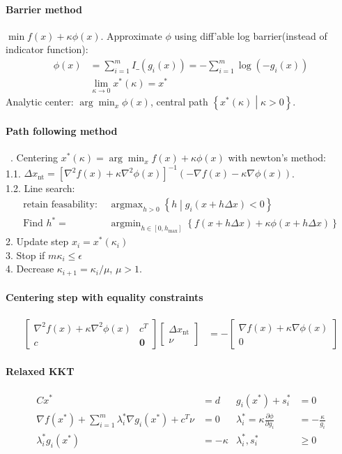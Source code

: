 \documentclass[landscape,a4paper,8pt]{scrartcl}
\newcommand{\Me}[1]{\begin{bmatrix}#1\end{bmatrix}} %
\DeclareMathOperator\argmin{argmin}
\DeclareMathOperator\argmax{argmax}
\begin{document}
\begin{multicols*}{3}
\paragraph{Barrier method}
$\min f(x) + \kappa \phi(x)$.
Approximate $\phi$ using diff'able log barrier(instead of indicator function):
\begin{align*}
\phi(x) &= \sum_{i=1}^{m} I\_(g_i(x)) = -\sum_{i=1}^{m} \log(-g_i(x)) \\
        & \lim_{\kappa \rightarrow 0} x^*(\kappa) = x^*
\end{align*}
Analytic center: $\arg\min_x \phi(x)$, central path $\left\{x^*(\kappa) \middle| \kappa > 0 \right\}$.

\paragraph{Path following method} \ . Centering 
$x^*(\kappa) = \arg\min_x f(x) + \kappa\phi(x)$ with newton's method: \\
1.1. $\Delta x_\text{nt} = \left[\nabla^2 f(x) + \kappa \nabla^2\phi(x)\right]^{-1}(-\nabla f(x) - \kappa \nabla \phi(x))$. \\
1.2. Line search:
\begin{align*}
\text{retain feasability: } & \argmax_{h > 0} \left\{ h \middle| g_i(x+h\Delta x) < 0 \right\} \\
\text{Find } h^* = & \argmin_{h\in[0,h_\text{max}]} \left\{ f(x+h\Delta x) + \kappa\phi(x+h\Delta x) \right\}
\end{align*}
2. Update step $x_i = x^*(\kappa_i)$ \\
3. Stop if $m\kappa_i \leq \epsilon$ \\
4. Decrease $\kappa_{i+1} = \kappa_{i}/\mu$, $\mu > 1$.

\paragraph{Centering step with equality constraints}
\begin{align*}
\Me{\nabla^2 f(x) + \kappa \nabla^2\phi(x) & c^T \\ c & \bm 0} \Me{\Delta x_\text{nt} \\ \nu} & = -\Me{\nabla f(x) + \kappa\nabla\phi(x) \\ 0}
\end{align*}

\paragraph{Relaxed KKT}
\begin{align*}
Cx^* & = d & g_i(x^*) + s_i^* & = 0 \\
\nabla f(x^*) + \sum_{i=1}^{m} \lambda_i^*\nabla g_i(x^*) + c^T \nu & = 0 & \lambda_i^* = \kappa\frac{\partial\phi}{\partial g_i} & = -\frac{\kappa}{g_i} \\
\lambda_i^*g_i(x^*) & = - \kappa & \lambda_i^*, s_i^* & \geq 0
\end{align*}


\end{multicols*}
\end{document}
